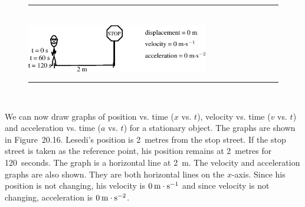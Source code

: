	\begin{figure}[H] %
    \begin{center}
    \rule[.1in]{\figurerulewidth}{.005in} \\
        \label{m38795*uid88!!!underscore!!!media}\label{m38795*uid88!!!underscore!!!printimage}\includegraphics[width=300px]{col11305.imgs/m38795_PG10C2_020.png} %
        
      \vspace{2pt}
    \vspace{.1in}
    \rule[.1in]{\figurerulewidth}{.005in} \\
        
    \end{center}

 \end{figure}   

    \addtocounter{footnote}{-0}
    
        \label{m38795*id69081}We can now draw graphs of position vs. time (\begin{math}x\end{math} vs. \begin{math}t\end{math}), velocity vs. time (\begin{math}v\end{math} vs. \begin{math}t\end{math}) and acceleration vs. time (\begin{math}a\end{math} vs. \begin{math}t\end{math}) for a stationary object. The graphs are shown in Figure~20.16.
Lesedi's position is 2~metres from the stop street. If the stop street is taken as the reference point, his position remains at 2~metres for 120~seconds. The graph is a horizontal line at 2~m.
The velocity and acceleration graphs are also shown. They are both horizontal lines on the \begin{math}x\end{math}-axis. Since his position is not changing, his velocity is \begin{math}0\phantom{\rule{2pt}{0ex}}\mathrm{m}\ensuremath{\cdot}\mathrm{s}{}^{-1}\end{math} and since velocity is not changing, acceleration is \begin{math}0\phantom{\rule{2pt}{0ex}}\mathrm{m}\ensuremath{\cdot}\mathrm{s}{}^{-2}\end{math}.\par 
        
